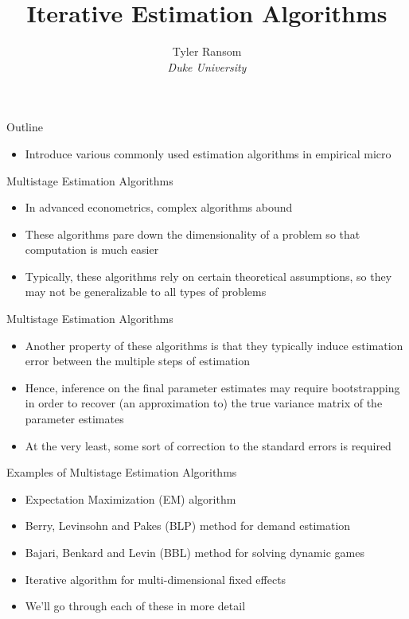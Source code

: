 \documentclass[english,xcolor=dvipsnames]{beamer}
\begin{document}
\begin{frame}
\title{Iterative Estimation Algorithms}
\author{
	Tyler Ransom\\
	\emph{Duke University}\\
}
\titlepage
\end{frame}

\begin{frame}{Outline}
\begin{itemize}
	\item Introduce various commonly used estimation algorithms in empirical micro
\end{itemize}
\end{frame}

\begin{frame}{Multistage Estimation Algorithms}
\begin{itemize}
	\item In advanced econometrics, complex algorithms abound
	\item These algorithms pare down the dimensionality of a problem so that computation is much easier
	\item Typically, these algorithms rely on certain theoretical assumptions, so they may not be generalizable to all types of problems
\end{itemize}
\end{frame}

\begin{frame}{Multistage Estimation Algorithms}
\begin{itemize}
	\item Another property of these algorithms is that they typically induce estimation error between the multiple steps of estimation
	\item Hence, inference on the final parameter estimates may require bootstrapping in order to recover (an approximation to) the true variance matrix of the parameter estimates
	\item At the very least, some sort of correction to the standard errors is required
\end{itemize}
\end{frame}

\begin{frame}{Examples of Multistage Estimation Algorithms}
\begin{itemize}
	\item Expectation Maximization (EM) algorithm
	\item Berry, Levinsohn and Pakes  (BLP) method for demand estimation
	\item Bajari, Benkard and Levin (BBL) method for solving dynamic games
	\item Iterative algorithm for multi-dimensional fixed effects
	\item We'll go through each of these in more detail
\end{itemize}
\end{frame}
\end{document}
